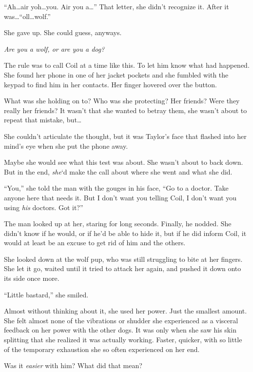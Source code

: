 ``Ah\ldots air yoh\ldots you.  Air you a\ldots''  That letter, she didn't recognize it.  After it was\ldots ``oll\ldots wolf.''



She gave up.  She could guess, anyways.



\emph{Are you a wolf, or are you a dog?}



The rule was to call Coil at a time like this.  To let him know what had happened.  She found her phone in one of her jacket pockets and she fumbled with the keypad to find him in her contacts.  Her finger hovered over the button.



What was she holding on to?  Who was she protecting?  Her friends?  Were they really her friends?  It wasn't that she wanted to betray them, she wasn't about to repeat that mistake, but\ldots



She couldn't articulate the thought, but it was Taylor's face that flashed into her mind's eye when she put the phone away.



Maybe she would see what this test was about.  She wasn't about to back down.  But in the end, \emph{she}`d make the call about where she went and what she did.



``You,'' she told the man with the gouges in his face, ``Go to a doctor.  Take anyone here that needs it.  But I don't want you telling Coil, I don't want you using \emph{his} doctors.  Got it?''



The man looked up at her, staring for long seconds.  Finally, he nodded.  She didn't know if he would, or if he'd be able to hide it, but if he did inform Coil, it would at least be an excuse to get rid of him and the others.



She looked down at the wolf pup, who was still struggling to bite at her fingers.  She let it go, waited until it tried to attack her again, and pushed it down onto its side once more.



``Little bastard,'' she smiled.



Almost without thinking about it, she used her power.  Just the smallest amount.  She felt almost none of the vibrations or shudder she experienced as a visceral feedback on her power with the other dogs.  It was only when she saw his skin splitting that she realized it was actually working.  Faster, quicker, with so little of the temporary exhaustion she so often experienced on her end.



Was it \emph{easier} with him?  What did that mean?





